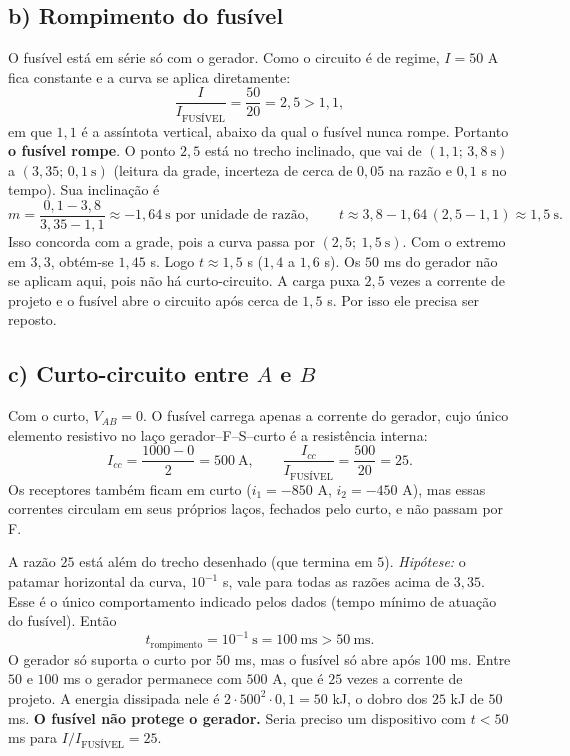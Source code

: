 \documentclass{article}%
\begin{document}
\subsection*{b) Rompimento do fusível}
O fusível está em série só com o gerador. Como o circuito é de regime, $I=50$ A fica constante e a curva se aplica diretamente:
\[
\frac{I}{I_{\text{FUSÍVEL}}}=\frac{50}{20}=2{,}5>1{,}1 ,
\]
em que $1{,}1$ é a assíntota vertical, abaixo da qual o fusível nunca rompe. Portanto \textbf{o fusível rompe}. O ponto $2{,}5$ está no trecho inclinado, que vai de $(1{,}1;\,3{,}8\ \text{s})$ a $(3{,}35;\,0{,}1\ \text{s})$ (leitura da grade, incerteza de cerca de $0{,}05$ na razão e $0{,}1$ s no tempo). Sua inclinação é
\[
m=\frac{0{,}1-3{,}8}{3{,}35-1{,}1}\approx-1{,}64\ \text{s por unidade de razão},
\qquad
t\approx 3{,}8-1{,}64\,(2{,}5-1{,}1)\approx 1{,}5\ \text{s}.
\]
Isso concorda com a grade, pois a curva passa por $(2{,}5;\ 1{,}5\ \text{s})$. Com o extremo em $3{,}3$, obtém-se $1{,}45$ s. Logo $t\approx1{,}5$ s ($1{,}4$ a $1{,}6$ s). Os $50$ ms do gerador não se aplicam aqui, pois não há curto-circuito. A carga puxa $2{,}5$ vezes a corrente de projeto e o fusível abre o circuito após cerca de $1{,}5$ s. Por isso ele precisa ser reposto.

\subsection*{c) Curto-circuito entre $A$ e $B$}
Com o curto, $V_{AB}=0$. O fusível carrega apenas a corrente do gerador, cujo único elemento resistivo no laço gerador--F--S--curto é a resistência interna:
\[
I_{cc}=\frac{1000-0}{2}=500\ \text{A},\qquad \frac{I_{cc}}{I_{\text{FUSÍVEL}}}=\frac{500}{20}=25 .
\]
Os receptores também ficam em curto ($i_1=-850$ A, $i_2=-450$ A), mas essas correntes circulam em seus próprios laços, fechados pelo curto, e não passam por F.

A razão $25$ está além do trecho desenhado (que termina em $5$). \emph{Hipótese:} o patamar horizontal da curva, $10^{-1}$ s, vale para todas as razões acima de $3{,}35$. Esse é o único comportamento indicado pelos dados (tempo mínimo de atuação do fusível). Então
\[
t_{\text{rompimento}}=10^{-1}\ \text{s}=100\ \text{ms}>50\ \text{ms}.
\]
O gerador só suporta o curto por $50$ ms, mas o fusível só abre após $100$ ms. Entre $50$ e $100$ ms o gerador permanece com $500$ A, que é $25$ vezes a corrente de projeto. A energia dissipada nele é $2\cdot500^2\cdot0{,}1=50$ kJ, o dobro dos $25$ kJ de $50$ ms. \textbf{O fusível não protege o gerador.} Seria preciso um dispositivo com $t<50$ ms para $I/I_{\text{FUSÍVEL}}=25$.
\end{document}
